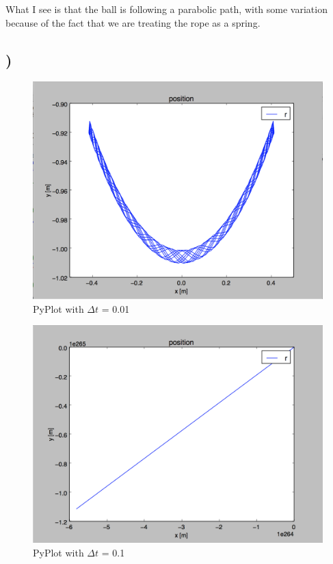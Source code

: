 \documentclass[a4paper,10pt,norsk]{article}
\begin{document}
 What I see is that the ball is following a parabolic path, with some variation because of the fact that we are treating the rope as a spring.
 
 \subsection{)}
 
 \begin{figure}[h!]
        \centering 
        \includegraphics[scale=0.4]{oppg_k_0,01.png} 
        \caption{PyPlot with $\Delta t$ = 0.01}
\end{figure}

\begin{figure}[h!]
        \centering 
        \includegraphics[scale=0.4]{oppg_k_0,1.png} 
        \caption{PyPlot with $\Delta t$ = 0.1}
\end{figure}
 
\end{document}
